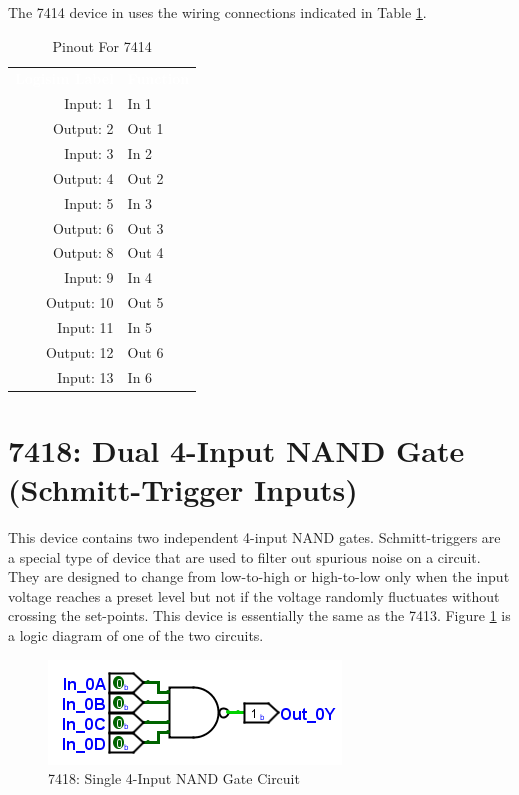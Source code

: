 The 7414 device in \LE uses the wiring connections indicated in Table \ref{tab:50-7414}.

\begin{table}[H]
	\sffamily
	\newcommand{\head}[1]{\textcolor{white}{\textbf{#1}}}		
	\begin{center}
		\begin{tabular}{rl} 
			\rowcolor{black!75}
			\head{Logisim Label} & \head{Function} \\
			Input: 1   & In 1  \\
			Output: 2  & Out 1  \\
			Input: 3   & In 2 \\
			Output: 4  & Out 2  \\
			Input: 5   & In 3  \\
			Output: 6  & Out 3 \\
			Output: 8  & Out 4  \\
			Input: 9   & In 4  \\
			Output: 10 & Out 5  \\
			Input: 11  & In 5  \\
			Output: 12 & Out 6 \\
			Input: 13  & In 6  \\
		\end{tabular}
	\end{center}
	\caption{Pinout For 7414}
	\label{tab:50-7414}
\end{table}

\section{7418: Dual 4-Input NAND Gate (Schmitt-Trigger Inputs)}

This device contains two independent 4-input NAND gates. Schmitt-triggers are a special type of device that are used to filter out spurious noise on a circuit. They are designed to change from low-to-high or high-to-low only when the input voltage reaches a preset level but not if the voltage randomly fluctuates without crossing the set-points. This device is essentially the same as the 7413. Figure \ref{fig:50-7418} is a logic diagram of one of the two circuits.

\begin{figure}[H]
	\centering
	\includegraphics{gfx/50-7413}
	\caption{7418: Single 4-Input NAND Gate Circuit}
	\label{fig:50-7418}
\end{figure}

